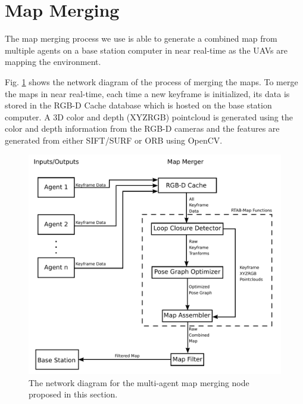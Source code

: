 \documentclass[letterpaper, 10 pt, conference]{ieeeconf}  %
\newcommand{\todo}[1]{{\color{blue}[TODO: #1]}}
\begin{document}
%
%
%
%

\section{Map Merging}\label{merge}

The map merging process we use is able to generate a combined map from multiple agents on a base station computer in near real-time as the UAVs are mapping the environment.

Fig. \ref{fig:map_merge} shows the network diagram of the process of merging the maps. To merge the maps in near real-time, each time a new keyframe is initialized, its data is stored in the RGB-D Cache database which is hosted on the base station computer. A 3D color and depth (XYZRGB) pointcloud is generated using the color and depth information from the RGB-D cameras and the features are generated from either SIFT/SURF or ORB using OpenCV.

\begin{figure}
\centering
\includegraphics[width=0.7\linewidth]{map_merger_network}
\caption{The network diagram for the multi-agent map merging node proposed in this section.}
\label{fig:map_merge}
\end{figure}
\end{document}

